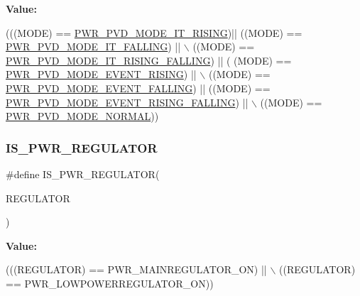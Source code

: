 {\bfseries Value\+:}
\begin{DoxyCode}
(((MODE) == \hyperlink{group___p_w_r___p_v_d___mode_ga102d7b8354419990a2a780f61cd020a6}{PWR\_PVD\_MODE\_IT\_RISING})|| ((MODE) == 
      \hyperlink{group___p_w_r___p_v_d___mode_gab600a54f3a588de836cfe4b727ab8a53}{PWR\_PVD\_MODE\_IT\_FALLING}) || \(\backslash\)
                              ((MODE) == \hyperlink{group___p_w_r___p_v_d___mode_gac531fbf14457e6595505354fad521b67}{PWR\_PVD\_MODE\_IT\_RISING\_FALLING}) || (
      (MODE) == \hyperlink{group___p_w_r___p_v_d___mode_ga1a946b01887aa886de329a92c3ab0dd4}{PWR\_PVD\_MODE\_EVENT\_RISING}) || \(\backslash\)
                              ((MODE) == \hyperlink{group___p_w_r___p_v_d___mode_gaaedbe45f1a1ea6c30af6ac51abae0cae}{PWR\_PVD\_MODE\_EVENT\_FALLING}) || ((MODE) 
      == \hyperlink{group___p_w_r___p_v_d___mode_ga7455387c8e9049f9f66b46423d4f4091}{PWR\_PVD\_MODE\_EVENT\_RISING\_FALLING}) || \(\backslash\)
                              ((MODE) == \hyperlink{group___p_w_r___p_v_d___mode_ga3a4bf701a36a14a4edf4dc5a28153277}{PWR\_PVD\_MODE\_NORMAL}))
\end{DoxyCode}
\mbox{\label{group___p_w_r___i_s___p_w_r___definitions_ga03c105070272141c0bab5f2b74469072}} 
\subsubsection{\texorpdfstring{I\+S\+\_\+\+P\+W\+R\+\_\+\+R\+E\+G\+U\+L\+A\+T\+OR}{IS\_PWR\_REGULATOR}}
{\footnotesize\ttfamily \#define I\+S\+\_\+\+P\+W\+R\+\_\+\+R\+E\+G\+U\+L\+A\+T\+OR(\begin{DoxyParamCaption}\item[{}]{R\+E\+G\+U\+L\+A\+T\+OR }\end{DoxyParamCaption})}

{\bfseries Value\+:}
\begin{DoxyCode}
(((REGULATOR) == PWR\_MAINREGULATOR\_ON) || \(\backslash\)
                                     ((REGULATOR) == PWR\_LOWPOWERREGULATOR\_ON))
\end{DoxyCode}
